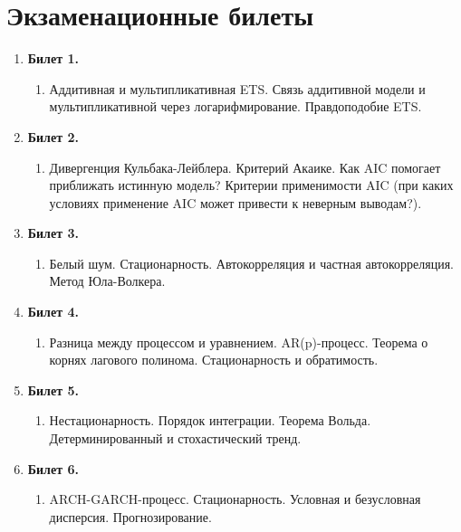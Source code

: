 \documentclass[12pt]{article}
\begin{document}
\section*{Экзаменационные билеты}

\begin{enumerate}

    \item \textbf{Билет 1.}
    \begin{enumerate}
        \item Аддитивная и мультипликативная ETS. Связь аддитивной модели и мультипликативной через логарифмирование. Правдоподобие ETS.
    \end{enumerate}

    \item \textbf{Билет 2.}
    \begin{enumerate}
        \item Дивергенция Кульбака-Лейблера. Критерий Акаике. Как AIC помогает приближать истинную модель? Критерии применимости AIC (при каких условиях применение AIC может привести к неверным выводам?).
    \end{enumerate}

    \item \textbf{Билет 3.}
    \begin{enumerate}
        \item Белый шум. Стационарность. Автокорреляция и частная автокорреляция. Метод Юла-Волкера.
    \end{enumerate}

    \item \textbf{Билет 4.}
    \begin{enumerate}
        \item Разница между процессом и уравнением. AR(p)-процесс. Теорема о корнях лагового полинома. Стационарность и обратимость.
    \end{enumerate}

    \item \textbf{Билет 5.}
    \begin{enumerate}
        \item Нестационарность. Порядок интеграции. Теорема Вольда. Детерминированный и стохастический тренд.
    \end{enumerate}

    \item \textbf{Билет 6.}
    \begin{enumerate}
        \item ARCH-GARCH-процесс. Стационарность. Условная и безусловная дисперсия. Прогнозирование.
    \end{enumerate}


\end{enumerate}
\end{document}
